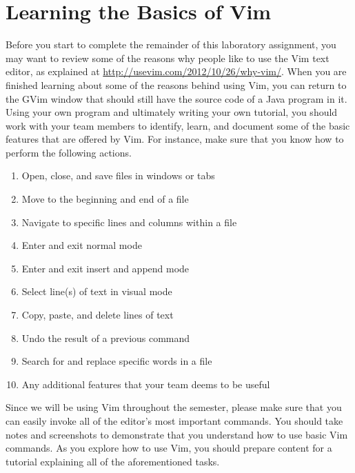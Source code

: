 \section*{Learning the Basics of Vim}

Before you start to complete the remainder of this laboratory assignment, you may want to review some of the reasons why people
like to use the Vim text editor, as explained at \url{http://usevim.com/2012/10/26/why-vim/}.  When you are finished learning about
some of the reasons behind using Vim, you can return to the GVim window that should still have the source code of a Java program
in it. Using your own program and ultimately writing your own tutorial, you should work with your team members to identify,
learn, and document some of the basic features that are offered by Vim.  For instance, make sure that you know how to perform the
following actions.  

\begin{enumerate}

	\item Open, close, and save files in windows or tabs

	\item Move to the beginning and end of a file

	\item Navigate to specific lines and columns within a file

	\item Enter and exit normal mode

	\item Enter and exit insert and append mode

	\item Select line(s) of text in visual mode

	\item Copy, paste, and delete lines of text

	\item Undo the result of a previous command

	\item Search for and replace specific words in a file 

	\item Any additional features that your team deems to be useful

\end{enumerate}

Since we will be using Vim throughout the semester, please make sure that you can easily invoke all of the editor's most
important commands.  You should take notes and screenshots to demonstrate that you understand how to use basic
Vim commands. As you explore how to use Vim, you should prepare content for a tutorial explaining all of the
aforementioned tasks. 


